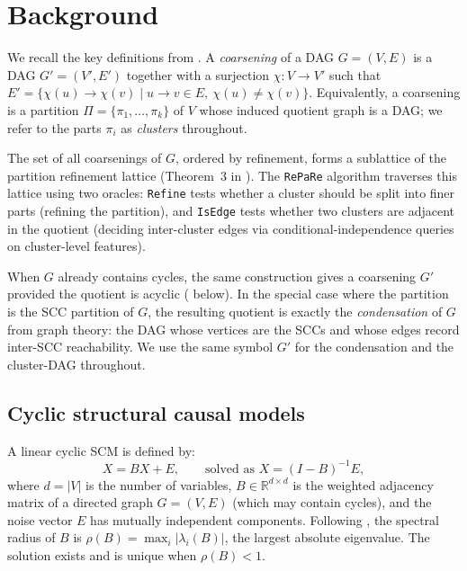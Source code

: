 \documentclass{article}
\begin{document}
\section{Background}
\label{sec:background}

We recall the key definitions from \citet{madaleno2026coarsening}. A \emph{coarsening} of a DAG $G = (V, E)$ is a DAG $G' = (V', E')$ together with a surjection $\chi: V \to V'$ such that $E' = \{\chi(u) \to \chi(v) \mid u \to v \in E,\ \chi(u) \neq \chi(v)\}$. Equivalently, a coarsening is a partition $\Pi = \{\pi_1, \ldots, \pi_k\}$ of $V$ whose induced quotient graph is a DAG; we refer to the parts $\pi_i$ as \emph{clusters} throughout.

The set of all coarsenings of $G$, ordered by refinement, forms a sublattice of the partition refinement lattice (Theorem~3 in \citet{madaleno2026coarsening}). The \texttt{RePaRe} algorithm traverses this lattice using two oracles: \texttt{Refine} tests whether a cluster should be split into finer parts (refining the partition), and \texttt{IsEdge} tests whether two clusters are adjacent in the quotient (deciding inter-cluster edges via conditional-independence queries on cluster-level features).

When $G$ already contains cycles, the same construction gives a coarsening $G'$ provided the quotient is acyclic ( below). In the special case where the partition is the SCC partition of $G$, the resulting quotient is exactly the \emph{condensation} of $G$ from graph theory: the DAG whose vertices are the SCCs and whose edges record inter-SCC reachability. We use the same symbol $G'$ for the condensation and the cluster-DAG throughout.

\subsection{Cyclic structural causal models}
\label{sec:cyclic-scm}

A linear cyclic SCM is defined by:
\begin{equation}\label{eq:sem}
    X = BX + E, \qquad \text{solved as } X = (I - B)^{-1} E,
\end{equation}
where $d = |V|$ is the number of variables, $B \in \mathbb{R}^{d \times d}$ is the weighted adjacency matrix of a directed graph $G = (V,E)$ (which may contain cycles), and the noise vector $E$ has mutually independent components. Following \citet{lacerda2008discovering}, the spectral radius of $B$ is $\rho(B) = \max_i |\lambda_i(B)|$, the largest absolute eigenvalue. The solution exists and is unique when $\rho(B) < 1$.
\end{document}
